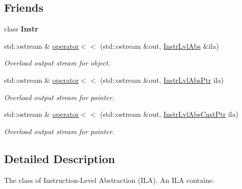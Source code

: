 \subsection*{Friends}
\begin{DoxyCompactItemize}
\item 
\mbox{\label{classilang_1_1_instr_lvl_abs_a13629efaa1da73ee7e2b06a17d8fdf4f}} 
class {\bfseries Instr}
\item 
\mbox{\label{classilang_1_1_instr_lvl_abs_aa05e9bcf38e04a16485f3d3f2b468ea2}} 
std\+::ostream \& \mbox{\hyperlink{classilang_1_1_instr_lvl_abs_aa05e9bcf38e04a16485f3d3f2b468ea2}{operator$<$$<$}} (std\+::ostream \&out, \mbox{\hyperlink{classilang_1_1_instr_lvl_abs}{Instr\+Lvl\+Abs}} \&ila)
\begin{DoxyCompactList}\small\item\em Overload output stream for object. \end{DoxyCompactList}\item 
\mbox{\label{classilang_1_1_instr_lvl_abs_a85b77acba029dd51e3ae383004a54ff3}} 
std\+::ostream \& \mbox{\hyperlink{classilang_1_1_instr_lvl_abs_a85b77acba029dd51e3ae383004a54ff3}{operator$<$$<$}} (std\+::ostream \&out, \mbox{\hyperlink{classilang_1_1_instr_lvl_abs_a743fd98e5ad145d70cb0dabf8db0007c}{Instr\+Lvl\+Abs\+Ptr}} ila)
\begin{DoxyCompactList}\small\item\em Overload output stream for pointer. \end{DoxyCompactList}\item 
\mbox{\label{classilang_1_1_instr_lvl_abs_a0eebefb13c22edb36b00319cea803edb}} 
std\+::ostream \& \mbox{\hyperlink{classilang_1_1_instr_lvl_abs_a0eebefb13c22edb36b00319cea803edb}{operator$<$$<$}} (std\+::ostream \&out, \mbox{\hyperlink{classilang_1_1_instr_lvl_abs_a57464e2e6a69327715fa88963ebfb282}{Instr\+Lvl\+Abs\+Cnst\+Ptr}} ila)
\begin{DoxyCompactList}\small\item\em Overload output stream for pointer. \end{DoxyCompactList}\end{DoxyCompactItemize}


\subsection{Detailed Description}
The class of Instruction-\/\+Level Abstraction (I\+LA). An I\+LA contains\+: 


